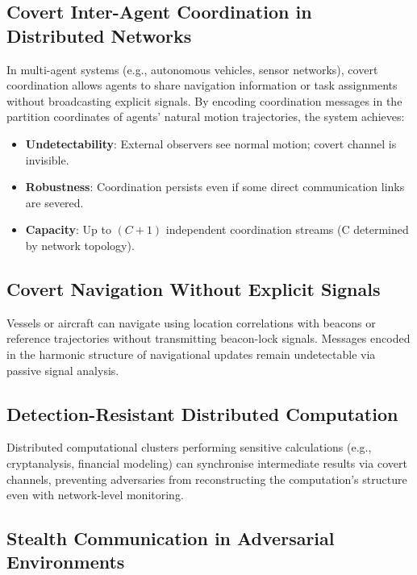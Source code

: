 \documentclass[11pt,twocolumn,a4paper]{article}
\theoremstyle{definition}
\begin{document}
\subsection{Covert Inter-Agent Coordination in Distributed Networks}

In multi-agent systems (e.g., autonomous vehicles, sensor networks), covert coordination allows agents to share navigation information or task assignments without broadcasting explicit signals. By encoding coordination messages in the partition coordinates of agents' natural motion trajectories, the system achieves:

\begin{itemize}[nosep]
\item \textbf{Undetectability}: External observers see normal motion; covert channel is invisible.
\item \textbf{Robustness}: Coordination persists even if some direct communication links are severed.
\item \textbf{Capacity}: Up to $(C+1)$ independent coordination streams (C determined by network topology).
\end{itemize}

\subsection{Covert Navigation Without Explicit Signals}

Vessels or aircraft can navigate using location correlations with beacons or reference trajectories without transmitting beacon-lock signals. Messages encoded in the harmonic structure of navigational updates remain undetectable via passive signal analysis.

\subsection{Detection-Resistant Distributed Computation}

Distributed computational clusters performing sensitive calculations (e.g., cryptanalysis, financial modeling) can synchronise intermediate results via covert channels, preventing adversaries from reconstructing the computation's structure even with network-level monitoring.

\subsection{Stealth Communication in Adversarial Environments}
\end{document}

